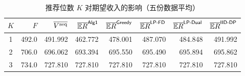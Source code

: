 \begin{table}[htbp]
\centering\small
\caption{推荐位数 $K$ 对期望收入的影响（五份数据平均）}\label{tab:K}
\begin{tabular}{crrrrrrr}
\toprule
$K$ & $F$ & $\overline{V^{\mathrm{seq}}}$ & $\overline{\mathbb E R}^{\textsf{Alg1}}$ & $\overline{\mathbb E R}^{\textsf{Greedy}}$ & $\overline{\mathbb E R}^{\textsf{LP-FD}}$ & $\overline{\mathbb E R}^{\textsf{LP-Dual}}$ & $\overline{\mathbb E R}^{\textsf{IID-DP}}$ \\
\midrule
1 & 492.0 & 491.992 & 462.772 & 478.001 & 487.070 & 484.848 & 491.992 \\
2 & 706.0 & 696.062 & 693.394 & 695.550 & 695.490 & 695.894 & 695.862 \\
3 & 734.0 & 727.810 & 727.810 & 727.810 & 727.810 & 727.810 & 727.810 \\
\bottomrule
\end{tabular}
\end{table}
